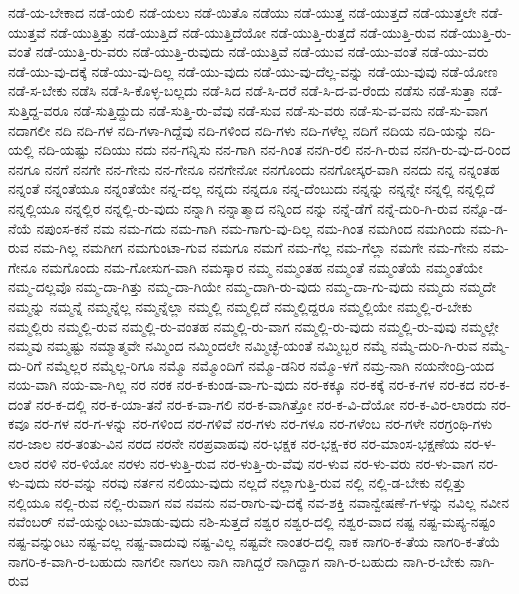 {ನಡೆ-ಯ-ಬೇಕಾದ
ನಡೆ-ಯಲಿ
ನಡೆ-ಯಲು
ನಡೆ-ಯಿತೊ
ನಡೆಯು
ನಡೆ-ಯುತ್ತ
ನಡೆ-ಯುತ್ತದೆ
ನಡೆ-ಯುತ್ತಲೇ
ನಡೆ-ಯುತ್ತವೆ
ನಡೆ-ಯುತ್ತಿತ್ತು
ನಡೆ-ಯುತ್ತಿದೆ
ನಡೆ-ಯುತ್ತಿದೆಯೋ
ನಡೆ-ಯುತ್ತಿ-ರುತ್ತದೆ
ನಡೆ-ಯುತ್ತಿ-ರುವ
ನಡೆ-ಯುತ್ತಿ-ರು-ವಂತೆ
ನಡೆ-ಯುತ್ತಿ-ರು-ವರು
ನಡೆ-ಯುತ್ತಿ-ರುವುದು
ನಡೆ-ಯುತ್ತಿವೆ
ನಡೆ-ಯುವ
ನಡೆ-ಯು-ವಂತೆ
ನಡೆ-ಯು-ವರು
ನಡೆ-ಯು-ವು-ದಕ್ಕೆ
ನಡೆ-ಯು-ವು-ದಿಲ್ಲ
ನಡೆ-ಯು-ವುದು
ನಡೆ-ಯು-ವು-ದೆಲ್ಲ-ವನ್ನು
ನಡೆ-ಯು-ವುವು
ನಡೆ-ಯೋಣ
ನಡೆ-ಸ-ಬೇಕು
ನಡೆಸಿ
ನಡೆ-ಸಿ-ಕೊಳ್ಳ-ಬಲ್ಲದು
ನಡೆ-ಸಿದ
ನಡೆ-ಸಿ-ದರೆ
ನಡೆ-ಸಿ-ದ-ವ-ರೆಂದು
ನಡೆಸು
ನಡೆ-ಸುತ್ತಾ
ನಡೆ-ಸುತ್ತಿದ್ದ-ವರೂ
ನಡೆ-ಸುತ್ತಿದ್ದುದು
ನಡೆ-ಸುತ್ತಿ-ರು-ವೆವು
ನಡೆ-ಸುವ
ನಡೆ-ಸು-ವರು
ನಡೆ-ಸು-ವ-ವನು
ನಡೆ-ಸು-ವಾಗ
ನದಾಗಲೀ
ನದಿ
ನದಿ-ಗಳ
ನದಿ-ಗಳಾ-ಗಿದ್ದೆವು
ನದಿ-ಗಳಿಂದ
ನದಿ-ಗಳು
ನದಿ-ಗಳೆಲ್ಲ
ನದಿಗೆ
ನದಿಯ
ನದಿ-ಯನ್ನು
ನದಿ-ಯಲ್ಲಿ
ನದಿ-ಯಷ್ಟು
ನದಿಯು
ನದು
ನನ-ಗನ್ನಿಸು
ನನ-ಗಾಗಿ
ನನ-ಗಿಂತ
ನನಗಿ-ರಲಿ
ನನ-ಗಿ-ರುವ
ನನಗಿ-ರು-ವು-ದ-ರಿಂದ
ನನಗೂ
ನನಗೆ
ನನಗೇ
ನನ-ಗೇನು
ನನ-ಗೇನೂ
ನನಗೇನೋ
ನನಗೊಂದು
ನನಗೋಸ್ಕರ-ವಾಗಿ
ನನದು
ನನ್ನ
ನನ್ನಂತಹ
ನನ್ನಂತೆ
ನನ್ನಂತೆಯೂ
ನನ್ನಂತೆಯೇ
ನನ್ನ-ದಲ್ಲ
ನನ್ನದು
ನನ್ನದೂ
ನನ್ನ-ದೆಂಬುದು
ನನ್ನನ್ನು
ನನ್ನನ್ನೇ
ನನ್ನಲ್ಲಿ
ನನ್ನಲ್ಲಿದೆ
ನನ್ನಲ್ಲಿಯೂ
ನನ್ನಲ್ಲಿರ
ನನ್ನಲ್ಲಿ-ರು-ವುದು
ನನ್ನಾಗಿ
ನನ್ನಾತ್ಮಾದ
ನನ್ನಿಂದ
ನನ್ನು
ನನ್ನೆ-ಡೆಗೆ
ನನ್ನೆ-ದುರಿ-ಗಿ-ರುವ
ನನ್ನೊ-ಡ-ನೆಯೆ
ನಪುಂಸ-ಕನೆ
ನಮ
ನಮ-ಗದು
ನಮ-ಗಾಗಿ
ನಮ-ಗಾಗು-ವು-ದಿಲ್ಲ
ನಮ-ಗಿಂತ
ನಮಗಿಂದ
ನಮಗಿಂದು
ನಮ-ಗಿ-ರುವ
ನಮ-ಗಿಲ್ಲ
ನಮಗೀಗ
ನಮಗುಂಟಾ-ಗುವ
ನಮಗೂ
ನಮಗೆ
ನಮ-ಗೆಲ್ಲ
ನಮ-ಗೆಲ್ಲಾ
ನಮಗೇ
ನಮ-ಗೇನು
ನಮ-ಗೇನೂ
ನಮಗೊಂದು
ನಮ-ಗೋಸುಗ-ವಾಗಿ
ನಮಸ್ಕಾರ
ನಮ್ಮ
ನಮ್ಮಂತಹ
ನಮ್ಮಂತೆ
ನಮ್ಮಂತೆಯೆ
ನಮ್ಮಂತೆಯೇ
ನಮ್ಮ-ದಲ್ಲವೊ
ನಮ್ಮ-ದಾ-ಗಿತ್ತು
ನಮ್ಮ-ದಾ-ಗಿಯೇ
ನಮ್ಮ-ದಾಗಿ-ರು-ವುದು
ನಮ್ಮ-ದಾ-ಗು-ವುದು
ನಮ್ಮದು
ನಮ್ಮದೇ
ನಮ್ಮನ್ನು
ನಮ್ಮನ್ನೆ
ನಮ್ಮನ್ನೆಲ್ಲ
ನಮ್ಮನ್ನೆಲ್ಲಾ
ನಮ್ಮಲ್ಲಿ
ನಮ್ಮಲ್ಲಿದೆ
ನಮ್ಮಲ್ಲಿದ್ದರೂ
ನಮ್ಮಲ್ಲಿಯೇ
ನಮ್ಮಲ್ಲಿ-ರ-ಬೇಕು
ನಮ್ಮಲ್ಲಿರು
ನಮ್ಮಲ್ಲಿ-ರುವ
ನಮ್ಮಲ್ಲಿ-ರು-ವಂತಹ
ನಮ್ಮಲ್ಲಿ-ರು-ವಾಗ
ನಮ್ಮಲ್ಲಿ-ರು-ವುದು
ನಮ್ಮಲ್ಲಿ-ರು-ವುವು
ನಮ್ಮಲ್ಲೇ
ನಮ್ಮವು
ನಮ್ಮಷ್ಟು
ನಮ್ಮಾತ್ಮವೇ
ನಮ್ಮಿಂದ
ನಮ್ಮಿಂದಲೇ
ನಮ್ಮಿಚ್ಛೆ-ಯಂತೆ
ನಮ್ಮಿಬ್ಬರ
ನಮ್ಮೆ
ನಮ್ಮೆ-ದುರಿ-ಗಿ-ರುವ
ನಮ್ಮೆ-ದು-ರಿಗೆ
ನಮ್ಮೆಲ್ಲರ
ನಮ್ಮೆಲ್ಲ-ರಿಗೂ
ನಮ್ಮೊ
ನಮ್ಮೊಂದಿಗೆ
ನಮ್ಮೊ-ಡನಿರ
ನಮ್ಮೊ-ಳಗೆ
ನಮ್ರ-ನಾಗಿ
ನಯನೇಂದ್ರಿ-ಯದ
ನಯ-ವಾಗಿ
ನಯ-ವಾ-ಗಿಲ್ಲ
ನರ
ನರಕ
ನರ-ಕ-ಕುಂಡ-ವಾ-ಗು-ವುದು
ನರ-ಕಕ್ಕೂ
ನರ-ಕಕ್ಕೆ
ನರ-ಕ-ಗಳ
ನರ-ಕದ
ನರ-ಕ-ದಂತೆ
ನರ-ಕ-ದಲ್ಲಿ
ನರ-ಕ-ಯಾ-ತನೆ
ನರ-ಕ-ವಾ-ಗಲಿ
ನರ-ಕ-ವಾಗಿತ್ತೋ
ನರ-ಕ-ವಿ-ದೆಯೋ
ನರ-ಕ-ವಿರ-ಲಾರದು
ನರ-ಕವೂ
ನರ-ಗಳ
ನರ-ಗ-ಳನ್ನು
ನರ-ಗಳಿಂದ
ನರ-ಗಳಿವೆ
ನರ-ಗಳು
ನರ-ಗಳೂ
ನರ-ಗಳೆಂಬ
ನರ-ಗಳೇ
ನರಗ್ರಂಥಿ-ಗಳು
ನರ-ಜಾಲ
ನರ-ತಂತು-ವಿನ
ನರದ
ನರನೇ
ನರಪ್ರವಾಹವು
ನರ-ಭಕ್ಷಕ
ನರ-ಭಕ್ಷ-ಕರ
ನರ-ಮಾಂಸ-ಭಕ್ಷಣೆಯ
ನರ-ಳ-ಲಾರ
ನರಳಿ
ನರ-ಳಿಯೋ
ನರಳು
ನರ-ಳುತ್ತಿ-ರುವ
ನರ-ಳುತ್ತಿ-ರು-ವೆವು
ನರ-ಳುವ
ನರ-ಳು-ವರು
ನರ-ಳು-ವಾಗ
ನರ-ಳು-ವುದು
ನರ-ವನ್ನು
ನರವು
ನರ್ತನ
ನಲಿಯು-ವುದು
ನಲ್ಲದೆ
ನಲ್ಲಾಗುತ್ತಿ-ರುವ
ನಲ್ಲಿ
ನಲ್ಲಿ-ಡ-ಬೇಕು
ನಲ್ಲಿತ್ತು
ನಲ್ಲಿಯೂ
ನಲ್ಲಿ-ರುವ
ನಲ್ಲಿ-ರುವಾಗ
ನವ
ನವನು
ನವ-ರಾಗು-ವು-ದಕ್ಕೆ
ನವ-ಶಕ್ತಿ
ನವಾನ್ವೇಷಣೆ-ಗ-ಳನ್ನು
ನವಿಲ್ಲ
ನವೀನ
ನವೆಂಬರ್
ನವೆ-ಯನ್ನುಂಟು-ಮಾಡು-ವುದು
ನಶಿ-ಸುತ್ತದೆ
ನಶ್ವರ
ನಶ್ವರ-ದಲ್ಲಿ
ನಶ್ವರ-ವಾದ
ನಷ್ಟ
ನಷ್ಟ-ಮಪ್ಯ-ನಷ್ಟಂ
ನಷ್ಟ-ವನ್ನುಂಟು
ನಷ್ಟ-ವಲ್ಲ
ನಷ್ಟ-ವಾದುವು
ನಷ್ಟ-ವಿಲ್ಲ
ನಷ್ಟವೇ
ನಾಂತರ-ದಲ್ಲಿ
ನಾಕ
ನಾಗರಿ-ಕ-ತೆಯ
ನಾಗರಿ-ಕ-ತೆಯೆ
ನಾಗರಿ-ಕ-ವಾಗಿ-ರ-ಬಹುದು
ನಾಗಲೀ
ನಾಗಲು
ನಾಗಿ
ನಾಗಿದ್ದರೆ
ನಾಗಿದ್ದಾಗ
ನಾಗಿ-ರ-ಬಹುದು
ನಾಗಿ-ರ-ಬೇಕು
ನಾಗಿ-ರುವ
}
